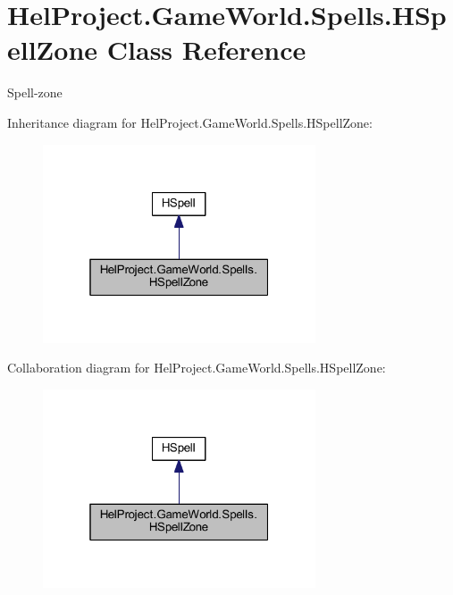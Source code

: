 \hypertarget{class_hel_project_1_1_game_world_1_1_spells_1_1_h_spell_zone}{}\section{Hel\+Project.\+Game\+World.\+Spells.\+H\+Spell\+Zone Class Reference}
\label{class_hel_project_1_1_game_world_1_1_spells_1_1_h_spell_zone}


Spell-\/zone  




Inheritance diagram for Hel\+Project.\+Game\+World.\+Spells.\+H\+Spell\+Zone\+:\nopagebreak
\begin{figure}[H]
\begin{center}
\leavevmode
\includegraphics[width=229pt]{class_hel_project_1_1_game_world_1_1_spells_1_1_h_spell_zone__inherit__graph}
\end{center}
\end{figure}


Collaboration diagram for Hel\+Project.\+Game\+World.\+Spells.\+H\+Spell\+Zone\+:\nopagebreak
\begin{figure}[H]
\begin{center}
\leavevmode
\includegraphics[width=229pt]{class_hel_project_1_1_game_world_1_1_spells_1_1_h_spell_zone__coll__graph}
\end{center}
\end{figure}
